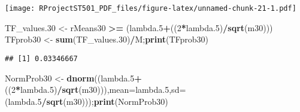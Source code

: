 \documentclass[
]{article}
\newenvironment{Shaded}{\begin{snugshade}}{\end{snugshade}}
\newcommand{\DataTypeTok}[1]{\textcolor[rgb]{0.13,0.29,0.53}{#1}}
\newcommand{\DecValTok}[1]{\textcolor[rgb]{0.00,0.00,0.81}{#1}}
\newcommand{\FloatTok}[1]{\textcolor[rgb]{0.00,0.00,0.81}{#1}}
\newcommand{\KeywordTok}[1]{\textcolor[rgb]{0.13,0.29,0.53}{\textbf{#1}}}
\newcommand{\NormalTok}[1]{#1}
\newcommand{\OperatorTok}[1]{\textcolor[rgb]{0.81,0.36,0.00}{\textbf{#1}}}
\newcommand{\OtherTok}[1]{\textcolor[rgb]{0.56,0.35,0.01}{#1}}
\newcommand{\StringTok}[1]{\textcolor[rgb]{0.31,0.60,0.02}{#1}}
\begin{document}
\begin{Shaded}
\end{Shaded}

\texttt{[image: RProjectST501\_PDF\_files/figure-latex/unnamed-chunk-21-1.pdf]}

\begin{Shaded}
\begin{Highlighting}[]
\NormalTok{TF_values}\FloatTok{.30}\NormalTok{ <-}\StringTok{ }\NormalTok{rMeans30 }\OperatorTok{>=}\StringTok{ }\NormalTok{(lambda}\FloatTok{.5}\OperatorTok{+}\NormalTok{((}\DecValTok{2}\OperatorTok{*}\NormalTok{lambda}\FloatTok{.5}\NormalTok{)}\OperatorTok{/}\KeywordTok{sqrt}\NormalTok{(m30)))}
\NormalTok{TFprob30 <-}\StringTok{ }\KeywordTok{sum}\NormalTok{(TF_values}\FloatTok{.30}\NormalTok{)}\OperatorTok{/}\NormalTok{M;}\KeywordTok{print}\NormalTok{(TFprob30)}
\end{Highlighting}
\end{Shaded}

\begin{verbatim}
## [1] 0.03346667
\end{verbatim}

\begin{Shaded}
\begin{Highlighting}[]
\NormalTok{NormProb30 <-}\StringTok{ }\KeywordTok{dnorm}\NormalTok{((lambda}\FloatTok{.5}\OperatorTok{+}\NormalTok{((}\DecValTok{2}\OperatorTok{*}\NormalTok{lambda}\FloatTok{.5}\NormalTok{)}\OperatorTok{/}\KeywordTok{sqrt}\NormalTok{(m30))),}\DataTypeTok{mean=}\NormalTok{lambda}\FloatTok{.5}\NormalTok{,}\DataTypeTok{sd=}\NormalTok{(lambda}\FloatTok{.5}\OperatorTok{/}\KeywordTok{sqrt}\NormalTok{(m30)));}\KeywordTok{print}\NormalTok{(NormProb30)}
\end{Highlighting}
\end{Shaded}
\end{document}
